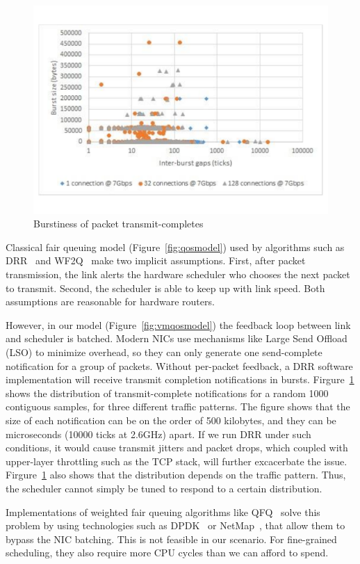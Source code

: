 \begin{figure}
\centering
\includegraphics[width=0.7\columnwidth, trim=60pt 20mm 0pt 8mm]{figures/completesburst}
\caption{Burstiness of packet transmit-completes}
\label{completesburst}
\vspace{-3mm}
\end{figure}

Classical fair queuing model (Figure~\ref{fig:qosmodel}) used by algorithms such
as DRR~\cite{drr} and WF2Q~\cite{wf2q} make two implicit assumptions. First,
after packet transmission, the link alerts the hardware scheduler who chooses the
next packet to transmit. Second, the scheduler is able to keep up with link
speed.  Both assumptions are reasonable for hardware routers.

However, in our model  (Figure~\ref{fig:vmqosmodel}) the feedback loop between
link and scheduler is batched.  Modern NICs use mechanisms like Large Send
Offload (LSO) to minimize overhead, so they can only generate one send-complete
notification for a group of packets.  Without per-packet feedback, a DRR
software implementation will receive transmit completion notifications in
bursts. Firgure~\ref{completesburst} shows the distribution of transmit-complete
notifications for a random 1000 contiguous samples, for three different traffic patterns.
The figure shows that the size of each notification can be on the order
of 500 kilobytes, and they can be microseconds (10000 ticks at 2.6GHz) apart. If
we run DRR under such conditions, it would cause transmit
jitters and packet drops, which coupled with upper-layer throttling such as the TCP
stack, will further excacerbate the issue.  Firgure~\ref{completesburst} also shows that 
the distribution depends on the traffic pattern. Thus, the scheduler cannot
simply be tuned to respond to a certain distribution.

Implementations of weighted fair queuing algorithms like QFQ~\cite{qfq} solve
this problem by using technologies such as DPDK~\cite{dpdk} or
NetMap~\cite{netmap}, that allow them to bypass the NIC batching.  This is not
feasible in our scenario. For fine-grained scheduling, they also require more
CPU cycles than we can afford to spend.

